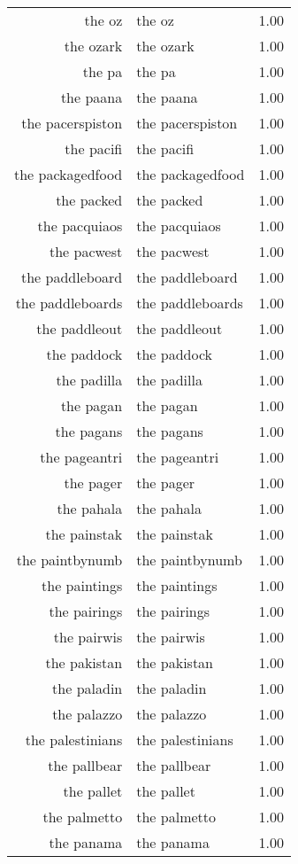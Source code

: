 \begin{table}[ht]
\begin{tabular}{rlr}
  the oz & the oz & 1.00 \\ 
  the ozark & the ozark & 1.00 \\ 
  the pa & the pa & 1.00 \\ 
  the paana & the paana & 1.00 \\ 
  the pacerspiston & the pacerspiston & 1.00 \\ 
  the pacifi & the pacifi & 1.00 \\ 
  the packagedfood & the packagedfood & 1.00 \\ 
  the packed & the packed & 1.00 \\ 
  the pacquiaos & the pacquiaos & 1.00 \\ 
  the pacwest & the pacwest & 1.00 \\ 
  the paddleboard & the paddleboard & 1.00 \\ 
  the paddleboards & the paddleboards & 1.00 \\ 
  the paddleout & the paddleout & 1.00 \\ 
  the paddock & the paddock & 1.00 \\ 
  the padilla & the padilla & 1.00 \\ 
  the pagan & the pagan & 1.00 \\ 
  the pagans & the pagans & 1.00 \\ 
  the pageantri & the pageantri & 1.00 \\ 
  the pager & the pager & 1.00 \\ 
  the pahala & the pahala & 1.00 \\ 
  the painstak & the painstak & 1.00 \\ 
  the paintbynumb & the paintbynumb & 1.00 \\ 
  the paintings & the paintings & 1.00 \\ 
  the pairings & the pairings & 1.00 \\ 
  the pairwis & the pairwis & 1.00 \\ 
  the pakistan & the pakistan & 1.00 \\ 
  the paladin & the paladin & 1.00 \\ 
  the palazzo & the palazzo & 1.00 \\ 
  the palestinians & the palestinians & 1.00 \\ 
  the pallbear & the pallbear & 1.00 \\ 
  the pallet & the pallet & 1.00 \\ 
  the palmetto & the palmetto & 1.00 \\ 
  the panama & the panama & 1.00 \\ 

\end{tabular}
\end{table}
